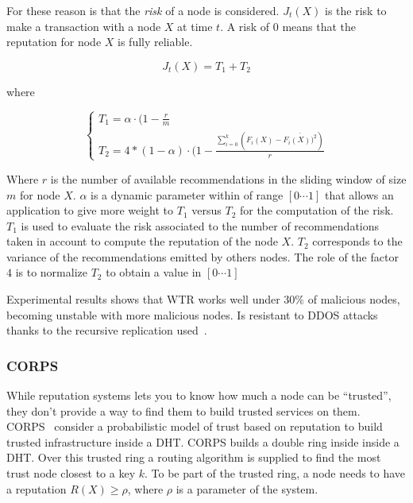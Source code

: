 For these reason is that the \textit{risk} of a node is considered. $J_t(X)$ is
the risk to make a transaction with a node $X$ at time $t$. A risk of 0
means that the reputation for node $X$ is fully reliable.

\begin{equation}
  J_t(X) =  T_1 + T_2
\end{equation}

where

\begin{equation}
  \left\{
  \begin{array}{l}
    T_1 = \alpha \cdot (1-\frac{r}{m}\\
    T_2 = 4 * (1- \alpha) \cdot (1-\frac{\sum_{i=0}^{k} (F_i(X)-\bar{F_i(X))^2})}{r}
  \end{array}\right.
\end{equation}

Where $r$ is the number of available recommendations in the sliding window of
size $m$ for node $X$. $\alpha$ is a dynamic parameter within of range
$[0\cdots 1]$ that allows an application to give more weight to $T_1$ versus
$T_2$ for the computation of the risk. $T_1$ is used to evaluate the risk
associated to the number of recommendations taken in account to compute the
reputation of the node $X$. $T_2$ corresponds to the variance of the
recommendations emitted by others nodes. The role of the factor $4$ is to
normalize $T_2$ to obtain a value in $[0\cdots 1]$

Experimental results shows that WTR works well under $30\%$ of malicious nodes,
becoming unstable with more malicious nodes. Is resistant to DDOS attacks
thanks to the recursive replication used~\cite{recursive_replication}.

\subsubsection{CORPS}
\label{sec:corps}
While reputation systems lets you to know how much a node can be
``trusted'', they don't provide a way to find them to build trusted services on
them. CORPS~\cite{corps} consider a probabilistic model of trust based on
reputation to build trusted infrastructure inside a DHT. CORPS builds a double
ring inside inside a DHT. Over this trusted ring a routing algorithm is supplied to
find the most trust node closest to a key $k$.
To be part of the trusted ring, a node needs to have a reputation $R(X) \ge
\rho$, where $\rho$ is a parameter of the system. 

